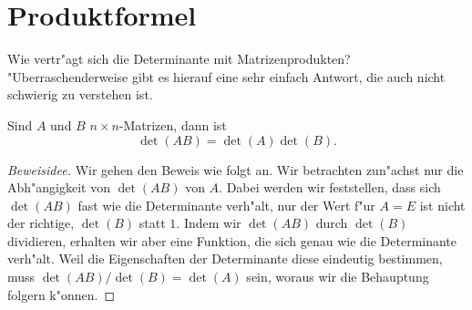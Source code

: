 \section{Produktformel}
Wie vertr"agt sich die Determinante mit Matrizenprodukten?
"Uberraschenderweise gibt es hierauf eine sehr einfach Antwort,
die auch nicht schwierig zu verstehen ist.

\begin{satz}\label{detprodukt}
Sind $A$ und $B$ $n\times n$-Matrizen, dann ist
\[
\det(AB)=\det(A)\det(B).
\]
\end{satz}

\begin{proof}[Beweisidee]
Wir gehen den Beweis wie folgt an.
Wir betrachten zun"achst nur die Abh"angigkeit von $\det(AB)$ von $A$.
Dabei werden wir feststellen,
dass sich $\det(AB)$ fast wie die Determinante verh"alt, nur der
Wert f"ur $A=E$ ist nicht der richtige, $\det(B)$ statt $1$.
Indem wir
$\det(AB)$ durch $\det(B)$ dividieren, erhalten wir aber eine Funktion,
die sich genau wie die Determinante verh"alt.
Weil die Eigenschaften der Determinante diese eindeutig bestimmen, muss
$\det(AB)/\det(B)=\det(A)$ sein, woraus wir die Behauptung folgern k"onnen.
\end{proof}

